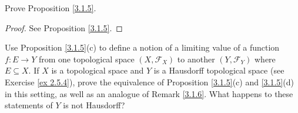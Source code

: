 \begin{exercise}\label{ex 3.1.2}
    Prove Proposition \ref{3.1.5}.
\end{exercise}

\begin{proof}
    See Proposition \ref{3.1.5}.
\end{proof}

\begin{exercise}\label{ex 3.1.3}
    Use Proposition \ref{3.1.5}(c) to define a notion of a limiting value of a function \(f : E \to Y\) from one topological space \((X, \mathcal{F}_X)\) to another \((Y, \mathcal{F}_Y)\) where \(E \subseteq X\).
    If \(X\) is a topological space and \(Y\) is a Hausdorff topological space (see Exercise \ref{ex 2.5.4}), prove the equivalence of Proposition \ref{3.1.5}(c) and \ref{3.1.5}(d) in this setting, as well as an analogue of Remark \ref{3.1.6}.
    What happens to these statements of \(Y\) is not Hausdorff?
\end{exercise}

